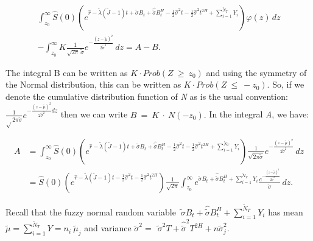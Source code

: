 \documentclass[12pt,a4paper]{report}
\numberwithin{equation}{section}
\begin{document}
\[
\begin{aligned}
\int_{z_{0}}^{\infty}\widehat{S}(0)\left(
e^{\widehat{r}-\widetilde{\lambda}\left(\widetilde{J}-1\right)t
+\widetilde{\sigma}B_{t}+\widehat{\widetilde{\sigma}}B_{t}^{H}
-\frac{1}{2}\widehat{\sigma}^{2}t-\frac{1}{2}\widehat{\sigma}^{2}t^{2H}
+\sum_{i=1}^{{\widetilde{N}}_{T}}Y_{i}}
\right)\varphi(z)\,dz \\
-\int_{z_{0}}^{\infty}K\frac{1}{\sqrt{2\pi}\,\widetilde{\sigma}}
e^{-\frac{(z-\widetilde{\mu})^{2}}{2\widetilde{\sigma}^{2}}}\,dz
= A-B .
\end{aligned}
\]



The integral B can be written as \(K \cdot Prob(Z\  \geq \ z_{0})\) and
using the symmetry of the Normal distribution, this can be written as
\(K \cdot Prob(Z\  \leq \  - z_{0}).\) So, if we denote the cumulative
distribution function of \emph{N} as is the usual convention:
\(\frac{1}{\sqrt{}2\pi\widetilde{\sigma}}e^{- \frac{(z - \widetilde{\mu})^{2}}{2{\widetilde{\sigma}}^{2}}dz}\)
then we can write \(B\  = \ K\  \cdot \ N( - z_{0}).\) In the integral
\emph{A}, we have:

\[
\begin{aligned}
A
&= \int_{z_{0}}^{\infty}\widehat{S}(0)\left(
e^{\widehat{r}-\widetilde{\lambda}\left(\widetilde{J}-1\right)t
+\widetilde{\sigma}B_{t}+\widehat{\widetilde{\sigma}}B_{t}^{H}
-\frac{1}{2}\widehat{\sigma}^{2}t-\frac{1}{2}\widehat{\sigma}^{2}t^{2H}
+\sum_{i=1}^{{\widetilde{N}}_{T}}Y_{i}}
\right)\frac{1}{\sqrt{2\pi\widetilde{\sigma}}}
e^{-\frac{(z-\widetilde{\mu})^{2}}{2\widetilde{\sigma}^{2}}}\,dz \\
&= \widehat{S}(0)\left(
e^{\widehat{r}-\widetilde{\lambda}\left(\widetilde{J}-1\right)t
-\frac{1}{2}\widehat{\sigma}^{2}t-\frac{1}{2}\widehat{\sigma}^{2}t^{2H}}
\right)\frac{1}{\sqrt{2\pi}}
\int_{z_{0}}^{\infty}
e^{\widetilde{\sigma}B_{t}+\widehat{\widetilde{\sigma}}B_{t}^{H}
+\sum_{i=1}^{{\widetilde{N}}_{T}}Y_{i}}
\frac{e^{-\frac{(z-\widetilde{\mu})^{2}}{2\widetilde{\sigma}^{2}}}}{\widetilde{\sigma}}\,dz .
\end{aligned}
\]


Recall that the fuzzy normal random variable
\(\widetilde{\ \sigma}B_{t} + \widehat{\widetilde{\sigma}}B_{t}^{H} + \sum_{i = 1}^{{\widetilde{N}}_{T}}Y_{i}\)
has mean
\(\widetilde{\mu} = \sum_{i = 1}^{{\widetilde{N}}_{T}}{Y = n}_{i}\ {\widetilde{\mu}}_{j}\)
and variance
\({\widetilde{\sigma}}^{2} = \ {\widetilde{\ \sigma}}^{2}T + {\widehat{\widetilde{\sigma}}}^{2}T^{2H} + n{\widetilde{\sigma}}_{j}^{2}.\)
\end{document}
